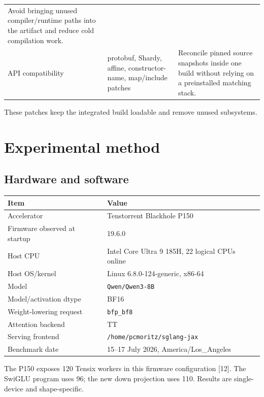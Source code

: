 \documentclass[
  10pt,
  american,
  10pt,
  letterpaper]{article}
\begin{document}
\begin{longtable}[]{@{}lll@{}}
\begin{minipage}[t]{0.30\columnwidth}
Avoid bringing unused compiler/runtime paths into the artifact and
reduce cold compilation work.\strut
\end{minipage}\tabularnewline
\begin{minipage}[t]{0.30\columnwidth}\raggedright
API compatibility\strut
\end{minipage} & \begin{minipage}[t]{0.30\columnwidth}\raggedright
protobuf, Shardy, affine, constructor-name, map/include patches\strut
\end{minipage} & \begin{minipage}[t]{0.30\columnwidth}\raggedright
Reconcile pinned source snapshots inside one build without relying on a
preinstalled matching stack.\strut
\end{minipage}\tabularnewline
\bottomrule
\end{longtable}

\endgroup

These patches keep the integrated build loadable and remove unused
subsystems.

\hypertarget{experimental-method}{%
\section{Experimental method}\label{experimental-method}}

\hypertarget{hardware-and-software}{%
\subsection{Hardware and software}\label{hardware-and-software}}

\begin{longtable}[]{@{}ll@{}}
\toprule
Item & Value\tabularnewline
\midrule
\endhead
Accelerator & Tenstorrent Blackhole P150\tabularnewline
Firmware observed at startup & 19.6.0\tabularnewline
Host CPU & Intel Core Ultra 9 185H, 22 logical CPUs
online\tabularnewline
Host OS/kernel & Linux 6.8.0-124-generic, x86-64\tabularnewline
Model & \texttt{Qwen/Qwen3-8B}\tabularnewline
Model/activation dtype & BF16\tabularnewline
Weight-lowering request & \texttt{bfp\_bf8}\tabularnewline
Attention backend & TT\tabularnewline
Serving frontend & \texttt{/home/pcmoritz/sglang-jax}\tabularnewline
Benchmark date & 15--17 July 2026, America/Los\_Angeles\tabularnewline
\bottomrule
\end{longtable}

The P150 exposes 120 Tensix workers in this firmware configuration
{[}12{]}. The SwiGLU program uses 96; the new down projection uses 110.
Results are single-device and shape-specific.
\end{document}
